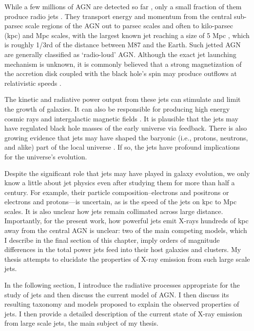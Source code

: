 While a few millions of AGN are detected so far \citep[e.g.,][]{Assef_2018}, only a small fraction of them produce radio jets \citep[e.g.,][]{ivezic2002optical,Padovani_2017}. They transport energy and momentum from the central sub-parsec scale regions of the AGN out to parsec scales and often to kilo-parsec (kpc) and Mpc scales, with the largest known jet reaching a size of 5 Mpc \citep{2022arXiv220205427O}, which is roughly 1/3rd of the distance between M87 and the Earth. Such jetted AGN are generally classified as `radio-loud' AGN. Although the exact jet launching mechanism is unknown, it is commonly believed that a strong magnetization of the accretion disk coupled with the black hole's spin may produce outflows at relativistic speeds \citep[][]{blandford2019relativistic}.

The kinetic and radiative power output from these jets can stimulate and limit the growth of galaxies. It can also be responsible for producing high energy cosmic rays and intergalactic magnetic fields \citep[for a recent review, see][]{blandford2019relativistic}. It is plausible that the jets may have regulated black hole masses of the early universe \citep{churazov2005supermassive} via feedback. There is also growing evidence that jets may have shaped the baryonic (i.e., protons, neutrons, and alike) part of the local universe  \citep[][]{fabian2012observational}. If so, the jets have profound implications for the universe's evolution.

Despite the significant role that jets may have played in galaxy evolution, we only know a little about jet physics even after studying them for more than half a century. For example, 
their particle composition--electrons and positrons or electrons and protons---is uncertain, as is the speed of the jets on kpc to Mpc scales. It is also unclear how jets remain collimated across large distance. Importantly, for the present work,  how powerful jets emit X-rays hundreds of kpc away from the central AGN is unclear: two of the main competing models, which I describe in the final section of this chapter, imply orders of magnitude differences in the total power jets feed into their host galaxies and clusters. My thesis attempts to elucidate the properties of X-ray emission from such large scale jets.

In the following section, I introduce the radiative processes appropriate for the study of jets and then discuss the current model of AGN. I then discuss its resulting taxonomy and models proposed to explain the observed properties of jets. I then provide a detailed description of the current state of X-ray emission from large scale jets, the main subject of my thesis.

